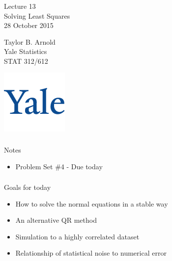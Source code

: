 



\begin{frame}[fragile] \frametitle{}

\vfill

{\fontsize{0.7cm}{0cm}\selectfont Lecture 13 \\\vspace{0.2cm}
Solving Least Squares}\\\vspace{0.5cm}
28 October 2015

\vspace{2cm}

\begin{minipage}{0.6\textwidth}
Taylor B. Arnold \\
Yale Statistics \\
STAT 312/612
\end{minipage}
\hfill
\begin{minipage}{0.3\textwidth}\raggedleft
\includegraphics[scale=0.3]{../yale-logo.png}
\end{minipage}%

\end{frame}

\begin{frame}[fragile] \frametitle{}

{\color{yaleblue}\fontsize{16pt}{20pt}\selectfont Notes}

\begin{itemize}
\item Problem Set \#4 - Due today
\end{itemize}

\end{frame}

\begin{frame}[fragile] \frametitle{}

{\color{yaleblue}\fontsize{16pt}{20pt}\selectfont Goals for today}

\begin{itemize}
\item How to solve the normal equations in a stable way
\item An alternative QR method
\item Simulation to a highly correlated dataset
\item Relationship of statistical noise to numerical error
\end{itemize}

\end{frame}

